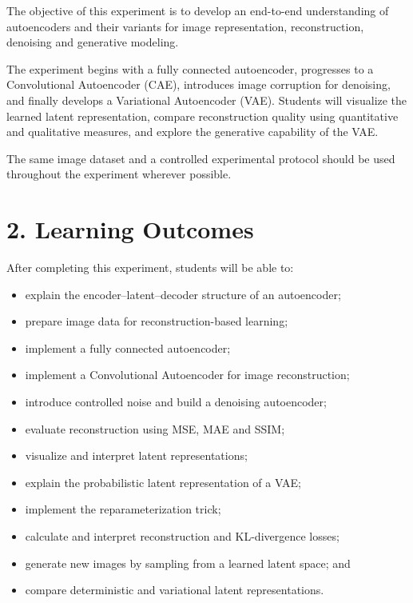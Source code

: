 \documentclass[10pt]{article}
\begin{document}
The objective of this experiment is to develop an end-to-end understanding of
autoencoders and their variants for image representation, reconstruction,
denoising and generative modeling.

The experiment begins with a fully connected autoencoder, progresses to a
Convolutional Autoencoder (CAE), introduces image corruption for denoising,
and finally develops a Variational Autoencoder (VAE). Students will visualize
the learned latent representation, compare reconstruction quality using
quantitative and qualitative measures, and explore the generative capability
of the VAE.

The same image dataset and a controlled experimental protocol should be used
throughout the experiment wherever possible.

\section*{2. Learning Outcomes}

After completing this experiment, students will be able to:

\begin{itemize}
\item explain the encoder--latent--decoder structure of an autoencoder;
\item prepare image data for reconstruction-based learning;
\item implement a fully connected autoencoder;
\item implement a Convolutional Autoencoder for image reconstruction;
\item introduce controlled noise and build a denoising autoencoder;
\item evaluate reconstruction using MSE, MAE and SSIM;
\item visualize and interpret latent representations;
\item explain the probabilistic latent representation of a VAE;
\item implement the reparameterization trick;
\item calculate and interpret reconstruction and KL-divergence losses;
\item generate new images by sampling from a learned latent space; and
\item compare deterministic and variational latent representations.
\end{itemize}

\end{document}
